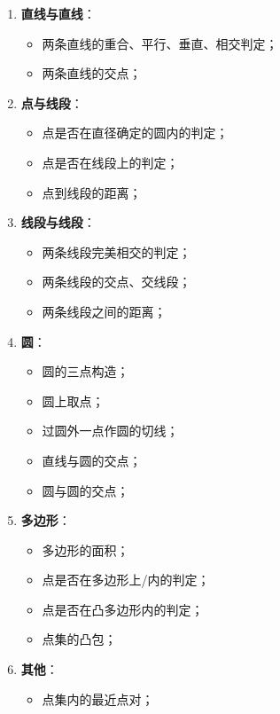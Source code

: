 \begin{enumerate}[noitemsep]
\begin{itemize}[noitemsep]
    \end{itemize}
    \item {\bf 直线与直线}：
    \begin{itemize}[noitemsep]
        \item 两条直线的重合、平行、垂直、相交判定；
        \item 两条直线的交点；
    \end{itemize}
    \item {\bf 点与线段}：
    \begin{itemize}[noitemsep]
        \item 点是否在直径确定的圆内的判定；
        \item 点是否在线段上的判定；
        \item 点到线段的距离；
    \end{itemize}
    \item {\bf 线段与线段}：
    \begin{itemize}[noitemsep]
        \item 两条线段完美相交的判定；
        \item 两条线段的交点、交线段；
        \item 两条线段之间的距离；
    \end{itemize}
    \item {\bf 圆}：
    \begin{itemize}[noitemsep]
        \item 圆的三点构造；
        \item 圆上取点；
        \item 过圆外一点作圆的切线；
        \item 直线与圆的交点；
        \item 圆与圆的交点；
    \end{itemize}
    \item {\bf 多边形}：
    \begin{itemize}[noitemsep]
        \item 多边形的面积；
        \item 点是否在多边形上/内的判定；
        \item 点是否在凸多边形内的判定；
        \item 点集的凸包；
    \end{itemize}
    \item {\bf 其他}：
    \begin{itemize}[noitemsep]
        \item 点集内的最近点对；
    \end{itemize}
\end{enumerate}



\newpage
